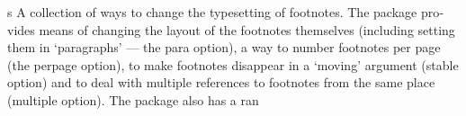 \documentclass[11pt,a4paper]{book}
\begin{document}
\meaning\normalfont

\beginnumbering
\pstart
s
A col­lec­tion of ways to change the type­set­ting of foot­notes. The pack­age pro­vides means of chang­ing the lay­out of the foot­notes them­selves (in­clud­ing set­ting them in ‘para­graphs’ — the para op­tion), a way to num­ber foot­notes per page (the per­page op­tion), to make foot­notes dis­ap­pear in a ‘mov­ing’ ar­gu­ment (sta­ble op­tion) and to deal with mul­ti­ple ref­er­ences to foot­notes from the same place (mul­ti­ple op­tion). The pack­age also has a ran
\pend
\endnumbering
\end{document}
